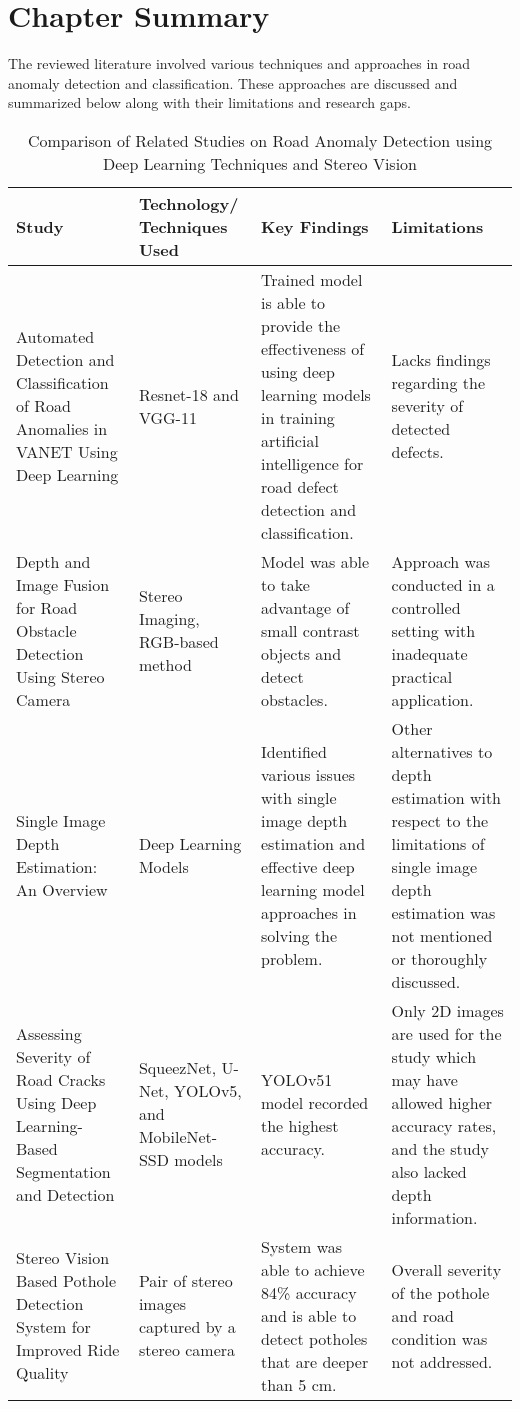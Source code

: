 \section{Chapter Summary}
The reviewed literature involved various techniques and approaches in  road anomaly detection and classification. These approaches are discussed and summarized below along with their limitations and research gaps.
\begin{table}[h!]
	\centering
	\hspace{-2cm}
	\small 
	\begin{tabular}{|p{3cm}|p{3.5cm}|p{4.5cm}|p{4.5cm}|}
		\hline
		\textbf{Study} & \textbf{Technology/
			Techniques Used} & \textbf{Key Findings} & \textbf{Limitations} \\ \hline
		
		Automated Detection and Classification of Road Anomalies in VANET Using Deep Learning & Resnet-18 and VGG-11 & Trained model is able to provide the effectiveness of using deep learning models in training artificial intelligence for road defect detection and classification. & Lacks findings regarding the severity of detected defects. \\ \hline
		
		Depth and Image Fusion for Road Obstacle Detection Using Stereo Camera & Stereo Imaging, RGB-based method & Model was able to take advantage of small contrast objects and detect obstacles. &  Approach was conducted in a controlled setting with inadequate practical application. \\ \hline
		
		Single Image Depth Estimation: An Overview & Deep Learning Models & Identified various issues with single image depth estimation and effective deep learning model approaches in solving the problem. & Other alternatives to depth estimation with respect to the limitations of single image depth estimation was not mentioned or thoroughly discussed. \\ \hline
		
		Assessing Severity of Road Cracks Using Deep Learning-Based Segmentation and Detection & SqueezNet, U-Net, YOLOv5, and MobileNet-SSD models & YOLOv51 model recorded the highest accuracy. & Only 2D images are used for the study which may have allowed higher accuracy rates, and the study also lacked depth information. \\ \hline
		
		Stereo Vision Based Pothole Detection System for Improved Ride Quality & Pair of stereo images captured by a stereo camera & System was able to achieve 84\% accuracy and is able to detect potholes that are deeper than 5 cm. & Overall severity of the pothole and road condition was not addressed. \\ \hline
		
	\end{tabular}
	\caption{Comparison of Related Studies on Road Anomaly Detection using Deep Learning Techniques and Stereo Vision}
	\label{tab:comparison}
	\hspace{-3cm}
	
	
\end{table}